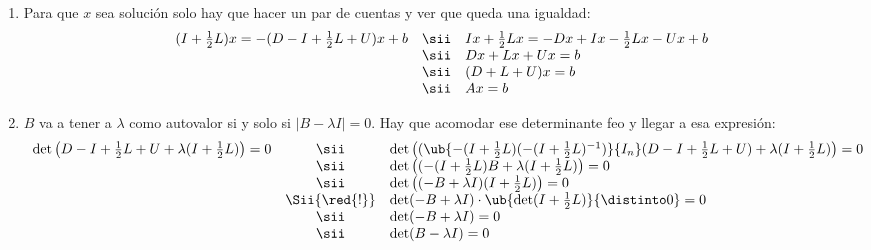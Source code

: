 \begin{enumerate}[label=(\alph*)]
  \item  Para que $x$ sea solución solo hay que hacer un par de cuentas y ver que queda una igualdad:
        $$
          \begin{array}{rcl}
            \textstyle
            (I + \frac{1}{2}L)x = - (D - I + \frac{1}{2}L + U)x + b
             & \sii &
            Ix + \frac{1}{2}Lx = -Dx + Ix - \frac{1}{2}Lx - Ux + b \\
             & \sii &
            Dx + Lx + Ux =  b                                      \\
             & \sii &
            (D + L + U)x =  b                                      \\
             & \sii &
            Ax =  b
          \end{array}
        $$

  \item  $B$ va a tener a $\lambda$ como autovalor si y solo si $|B - \lambda I| = 0$. Hay que acomodar ese determinante feo y llegar
        a esa expresión:
        {\footnotesize
        $$
          \begin{array}{rcl}
            \det\big(
            D - I + \frac{1}{2}L + U + \lambda(I + \frac{1}{2}L)
            \big) = 0
             & \sii          &
            \det\big(
            (\ub{-(I + \frac{1}{2}L)(-(I + \frac{1}{2}L)^{-1})}{I_n}
            (D - I + \frac{1}{2}L + U) + \lambda(I + \frac{1}{2}L)
            \big) = 0          \\
             & \sii          &
            \det\big(
            (-(I + \frac{1}{2}L)B
            + \lambda(I + \frac{1}{2}L)
            \big) = 0          \\
             & \sii          &
            \det\big(
            (-B + \lambda I)(I + \frac{1}{2}L)
            \big) = 0          \\
             & \Sii{\red{!}} &
            \det( -B + \lambda I)
            \cdot
            \ub{\det( I + \frac{1}{2}L)}
            {
              \distinto 0
            }
            = 0                \\
             & \sii          &
            \det( -B + \lambda I)
            = 0                \\
             & \sii          &
            \det( B - \lambda I)
            = 0                \\
          \end{array}
        $$
        }


\end{enumerate}
